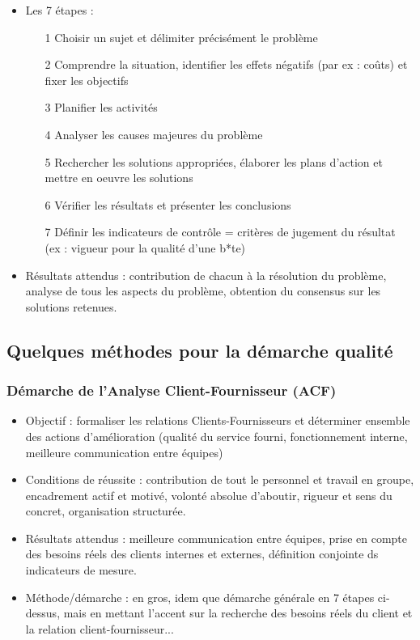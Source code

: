 \begin{itemize}
			\item Les 7 étapes : 
				\begin{itemize}
				\item[1] Choisir un sujet et délimiter précisément le problème
				\item[2] Comprendre la situation, identifier les effets négatifs (par ex : coûts) et fixer les objectifs
				\item[3] Planifier les activités
				\item[4] Analyser les causes majeures du problème
				\item[5] Rechercher les solutions appropriées, élaborer les plans d'action et mettre en oeuvre les solutions
				\item[6] Vérifier les résultats et présenter les conclusions
				\item[7] Définir les indicateurs de contrôle = critères de jugement du résultat (ex : vigueur pour la qualité d'une b*te) 
				\end{itemize}
			\item Résultats attendus : contribution de chacun à la résolution du problème, analyse de tous les aspects du problème, obtention du consensus sur les solutions retenues. 
			\end{itemize}
		\subsection{Quelques méthodes pour la démarche qualité}
			\subsubsection{Démarche de l'Analyse Client-Fournisseur (ACF)}
				\begin{itemize}
				\item Objectif : formaliser les relations Clients-Fournisseurs et déterminer ensemble des actions d'amélioration (qualité du service fourni, fonctionnement interne, meilleure communication entre équipes)
				\item Conditions de réussite : contribution de tout le personnel et travail en groupe, encadrement actif et motivé, volonté absolue d'aboutir, rigueur et sens du concret, organisation structurée. 
				\item Résultats attendus : meilleure communication entre équipes, prise en compte des besoins réels des clients internes et externes, définition conjointe ds indicateurs de mesure. 
				\item Méthode/démarche : en gros, idem que démarche générale en 7 étapes ci-dessus, mais en mettant l'accent sur la recherche des besoins réels du client et la relation client-fournisseur... 
				\end{itemize}
